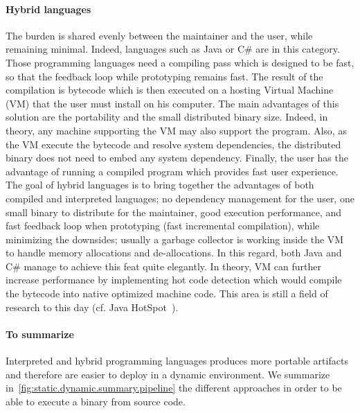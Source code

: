 \paragraph{Hybrid languages} The burden is shared evenly between the maintainer and the user, while remaining minimal.
Indeed, languages such as Java or C\# are in this category. Those programming languages need a compiling pass which is
designed to be fast, so that the feedback loop while prototyping remains fast. The result of the compilation is bytecode
which is then executed on a hosting Virtual Machine (VM) that the user must install on his computer. The main
advantages of this solution are the portability and the small distributed binary size. Indeed, in theory, any machine
supporting the VM may also support the program. Also, as the VM execute the bytecode and resolve system dependencies,
the distributed binary does not need to embed any system dependency. Finally, the user has the advantage of running a
compiled program which provides fast user experience. The goal of hybrid languages is to bring together the advantages
of both compiled and interpreted languages; no dependency management for the user, one small binary to distribute for
the maintainer, good execution performance, and fast feedback loop when prototyping (fast incremental compilation),
while minimizing the downsides; usually a garbage collector is working inside the VM to handle memory allocations and
de-allocations. In this regard, both Java and C\# manage to achieve this feat quite elegantly. In theory, VM can further
increase performance by implementing hot code detection which would compile the bytecode into native optimized machine
code. This area is still a field of research to this day (cf. Java
HotSpot~\parencite{xie.improving,kotzmann.2008.hotspot,halli.2016.java-hpc}).

\paragraph{To summarize} Interpreted and hybrid programming languages produces more portable artifacts and therefore are
easier to deploy in a dynamic environment. We summarize in~\cref{fig:static.dynamic.summary.pipeline} the different
approaches in order to be able to execute a binary from source code.


